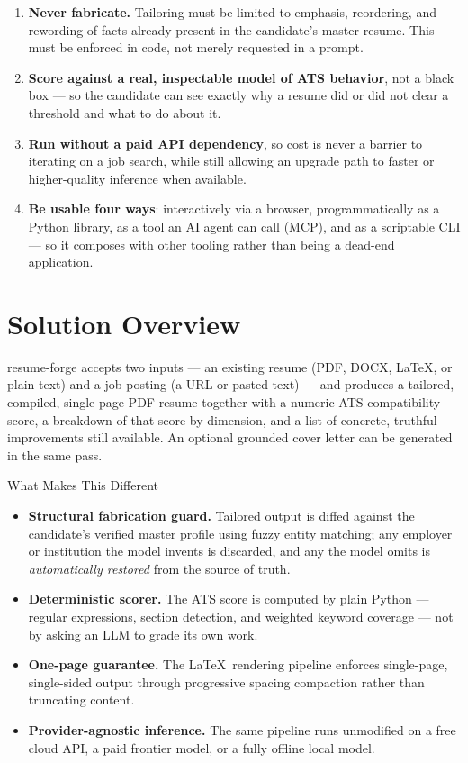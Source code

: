 \documentclass[10.5pt,letterpaper]{article}
\begin{document}
\begin{enumerate}
  \item \textbf{Never fabricate.} Tailoring must be limited to emphasis, reordering, and
    rewording of facts already present in the candidate's master resume. This must be
    enforced in code, not merely requested in a prompt.
  \item \textbf{Score against a real, inspectable model of ATS behavior}, not a black box ---
    so the candidate can see exactly why a resume did or did not clear a threshold and what
    to do about it.
  \item \textbf{Run without a paid API dependency}, so cost is never a barrier to iterating on
    a job search, while still allowing an upgrade path to faster or higher-quality inference
    when available.
  \item \textbf{Be usable four ways}: interactively via a browser, programmatically as a
    Python library, as a tool an AI agent can call (MCP), and as a scriptable CLI --- so it
    composes with other tooling rather than being a dead-end application.
\end{enumerate}

\newpage

\section{Solution Overview}

resume-forge accepts two inputs --- an existing resume (PDF, DOCX, \LaTeX, or plain text) and
a job posting (a URL or pasted text) --- and produces a tailored, compiled, single-page PDF
resume together with a numeric ATS compatibility score, a breakdown of that score by
dimension, and a list of concrete, truthful improvements still available. An optional
grounded cover letter can be generated in the same pass.

\begin{statbox}{What Makes This Different}
\begin{itemize}
  \item \textbf{Structural fabrication guard.} Tailored output is diffed against the
    candidate's verified master profile using fuzzy entity matching; any employer or
    institution the model invents is discarded, and any the model omits is
    \emph{automatically restored} from the source of truth.
  \item \textbf{Deterministic scorer.} The ATS score is computed by plain Python --- regular
    expressions, section detection, and weighted keyword coverage --- not by asking an LLM to
    grade its own work.
  \item \textbf{One-page guarantee.} The \LaTeX\ rendering pipeline enforces single-page,
    single-sided output through progressive spacing compaction rather than truncating
    content.
  \item \textbf{Provider-agnostic inference.} The same pipeline runs unmodified on a free
    cloud API, a paid frontier model, or a fully offline local model.
\end{itemize}
\end{statbox}
\end{document}
